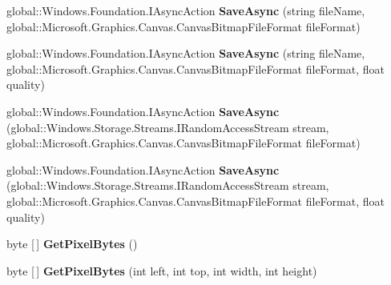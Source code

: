 \begin{DoxyCompactItemize}
global\+::\+Windows.\+Foundation.\+I\+Async\+Action {\bfseries Save\+Async} (string file\+Name, global\+::\+Microsoft.\+Graphics.\+Canvas.\+Canvas\+Bitmap\+File\+Format file\+Format)
\item 
\mbox{\label{interface_microsoft_1_1_graphics_1_1_canvas_1_1_i_canvas_bitmap_aa1b618fcc1333742a9cd060b9c7fdae5}} 
global\+::\+Windows.\+Foundation.\+I\+Async\+Action {\bfseries Save\+Async} (string file\+Name, global\+::\+Microsoft.\+Graphics.\+Canvas.\+Canvas\+Bitmap\+File\+Format file\+Format, float quality)
\item 
\mbox{\label{interface_microsoft_1_1_graphics_1_1_canvas_1_1_i_canvas_bitmap_a5dcf0ab30780f638bbfddc389d7b02db}} 
global\+::\+Windows.\+Foundation.\+I\+Async\+Action {\bfseries Save\+Async} (global\+::\+Windows.\+Storage.\+Streams.\+I\+Random\+Access\+Stream stream, global\+::\+Microsoft.\+Graphics.\+Canvas.\+Canvas\+Bitmap\+File\+Format file\+Format)
\item 
\mbox{\label{interface_microsoft_1_1_graphics_1_1_canvas_1_1_i_canvas_bitmap_afdef00bc9d9842506f809195ede3782f}} 
global\+::\+Windows.\+Foundation.\+I\+Async\+Action {\bfseries Save\+Async} (global\+::\+Windows.\+Storage.\+Streams.\+I\+Random\+Access\+Stream stream, global\+::\+Microsoft.\+Graphics.\+Canvas.\+Canvas\+Bitmap\+File\+Format file\+Format, float quality)
\item 
\mbox{\label{interface_microsoft_1_1_graphics_1_1_canvas_1_1_i_canvas_bitmap_ab71519e7f2009a2ac025f505eab45531}} 
byte \mbox{[}$\,$\mbox{]} {\bfseries Get\+Pixel\+Bytes} ()
\item 
\mbox{\label{interface_microsoft_1_1_graphics_1_1_canvas_1_1_i_canvas_bitmap_a41fdae7de41d057403b9f1a16ecff1d2}} 
byte \mbox{[}$\,$\mbox{]} {\bfseries Get\+Pixel\+Bytes} (int left, int top, int width, int height)
\item 
\mbox{\label{interface_microsoft_1_1_graphics_1_1_canvas_1_1_i_canvas_bitmap_a36158bf3dac9d5cdb9a1a41a7fc3708d}} 

\end{DoxyCompactItemize}
